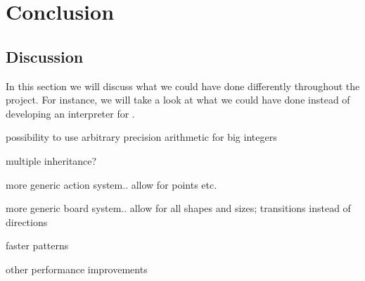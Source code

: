 \chapter{Conclusion}
\label{chap:conclusion}



\section{Discussion}
\label{sec:discussion}

In this section we will discuss what we could have done differently throughout
the project. For instance, we will take a look at what we could have done
instead of developing an interpreter for \productname{}.





possibility to use arbitrary precision arithmetic for big integers

multiple inheritance?

more generic action system.. allow for points etc.

more generic board system.. allow for all shapes and sizes; transitions instead
of directions

faster patterns

other performance improvements
